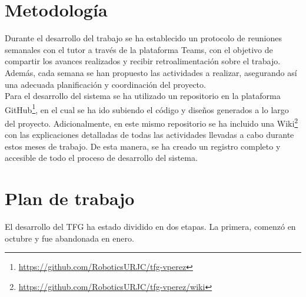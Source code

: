 \section{Metodología}
\label{sec:metodologia}
\noindent Durante el desarrollo del trabajo se ha establecido un protocolo de reuniones semanales con el tutor a 
través de la plataforma Teams, con el objetivo de compartir los avances realizados y recibir retroalimentación 
sobre el trabajo. Además, cada semana se han propuesto las actividades a realizar, asegurando así una adecuada 
planificación y coordinación del proyecto. \\
Para el desarrollo del sistema se ha utilizado un repositorio en la plataforma GitHub\footnote{\url{https://github.com/RoboticsURJC/tfg-vperez}}, en el cual se ha ido
subiendo el código y diseños generados a lo largo del proyecto. Adicionalmente, en este mismo repositorio 
se ha incluido una Wiki\footnote{\url{https://github.com/RoboticsURJC/tfg-vperez/wiki}} con las explicaciones detalladas de todas las actividades llevadas a cabo durante estos 
meses de trabajo. De esta manera, se ha creado un registro completo y accesible de todo el proceso de desarrollo del sistema.

\section{Plan de trabajo}
\label{sec:plantrabajo}
\noindent El desarrollo del TFG ha estado dividido en dos etapas. La primera, comenzó en octubre y fue abandonada en enero. 


